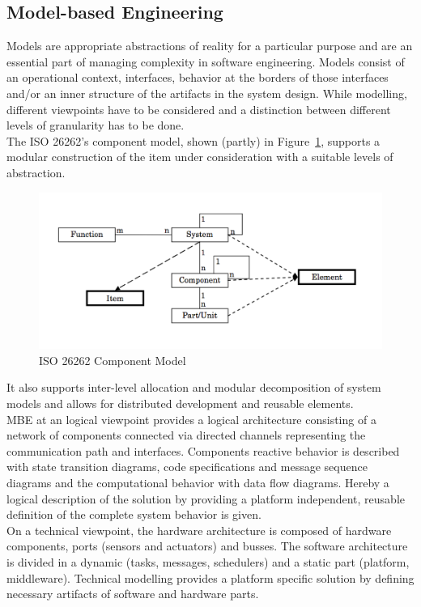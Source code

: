 \subsection{Model-based Engineering}
Models are appropriate abstractions of reality for a particular purpose and are an essential part of managing complexity in software engineering.
Models consist of an operational context, interfaces, behavior at the borders of those interfaces and/or an inner structure of the artifacts in the system design.
While modelling, different viewpoints have to be considered and a distinction between different levels of granularity has to be done.\\

The ISO 26262's component model, shown (partly) in Figure~\ref{fig:iso_component_model}, supports a modular construction of the item under consideration with a suitable levels of abstraction.
\begin{figure}[h]
  \centering
  \includegraphics[width=.8\textwidth]{images/iso_component_model.png}
  \caption{ISO 26262 Component Model}\label{fig:iso_component_model}
\end{figure}
It also supports inter-level allocation and modular decomposition of system models and allows for distributed development and reusable elements.\\

MBE at an logical viewpoint provides a logical architecture consisting of a network of components connected via directed channels representing the communication path and interfaces.
Components reactive behavior is described with state transition diagrams, code specifications and message sequence diagrams and the computational behavior with data flow diagrams.
Hereby a logical description of the solution by providing a platform independent, reusable definition of the complete system behavior is given.\\

On a technical viewpoint, the hardware architecture is composed of hardware components, ports (sensors and actuators) and busses.
The software architecture is divided in a dynamic (tasks, messages, schedulers) and a static part (platform, middleware).
Technical modelling provides a platform specific solution by defining necessary artifacts of software and hardware parts.\\

